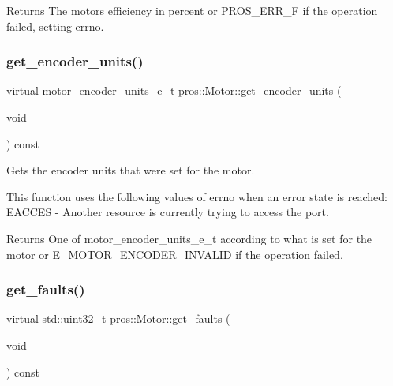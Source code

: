 \begin{DoxyReturn}{Returns}
The motor\textquotesingle{}s efficiency in percent or P\+R\+O\+S\+\_\+\+E\+R\+R\+\_\+F if the operation failed, setting errno. 
\end{DoxyReturn}
\mbox{\label{classpros_1_1Motor_a9fd37f3efa2f903bda8bf575b0052fd2}} 
\subsubsection{\texorpdfstring{get\_encoder\_units()}{get\_encoder\_units()}}
{\footnotesize\ttfamily virtual \mbox{\hyperlink{motors_8h_a6677ba23760c558fd8b7b4e1e00a6123}{motor\+\_\+encoder\+\_\+units\+\_\+e\+\_\+t}} pros\+::\+Motor\+::get\+\_\+encoder\+\_\+units (\begin{DoxyParamCaption}\item[{void}]{ }\end{DoxyParamCaption}) const\hspace{0.3cm}{\ttfamily [virtual]}}



Gets the encoder units that were set for the motor. 

This function uses the following values of errno when an error state is reached\+: E\+A\+C\+C\+ES -\/ Another resource is currently trying to access the port.

\begin{DoxyReturn}{Returns}
One of motor\+\_\+encoder\+\_\+units\+\_\+e\+\_\+t according to what is set for the motor or E\+\_\+\+M\+O\+T\+O\+R\+\_\+\+E\+N\+C\+O\+D\+E\+R\+\_\+\+I\+N\+V\+A\+L\+ID if the operation failed. 
\end{DoxyReturn}
\mbox{\label{classpros_1_1Motor_a66c6f6420485059af301a9c8a99b2045}} 
\subsubsection{\texorpdfstring{get\_faults()}{get\_faults()}}
{\footnotesize\ttfamily virtual std\+::uint32\+\_\+t pros\+::\+Motor\+::get\+\_\+faults (\begin{DoxyParamCaption}\item[{void}]{ }\end{DoxyParamCaption}) const\hspace{0.3cm}{\ttfamily [virtual]}}



